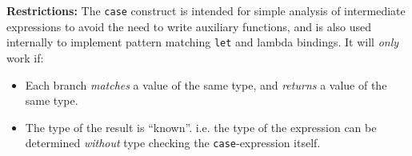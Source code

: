 \noindent
\textbf{Restrictions:} The \texttt{case} construct is intended for simple analysis
of intermediate expressions to avoid the need to write auxiliary functions, and is
also used internally to implement pattern matching \texttt{let} and lambda bindings. 
It will \emph{only} work if:

\begin{itemize}
\item Each branch \emph{matches} a value of the same type, and \emph{returns} a
value of the same type.
\item The type of the result is ``known''. i.e. the type of the expression can be
determined \emph{without} type checking the \texttt{case}-expression itself. 
\end{itemize}

